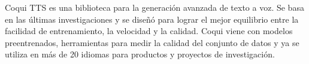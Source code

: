 Coqui TTS es una biblioteca para la generación avanzada de texto a voz. Se basa en las últimas investigaciones y se diseñó para lograr el mejor equilibrio entre la facilidad de entrenamiento, la velocidad y la calidad. Coqui viene con modelos preentrenados, herramientas para medir la calidad del conjunto de datos y ya se utiliza en más de 20 idiomas para productos y proyectos de investigación.

